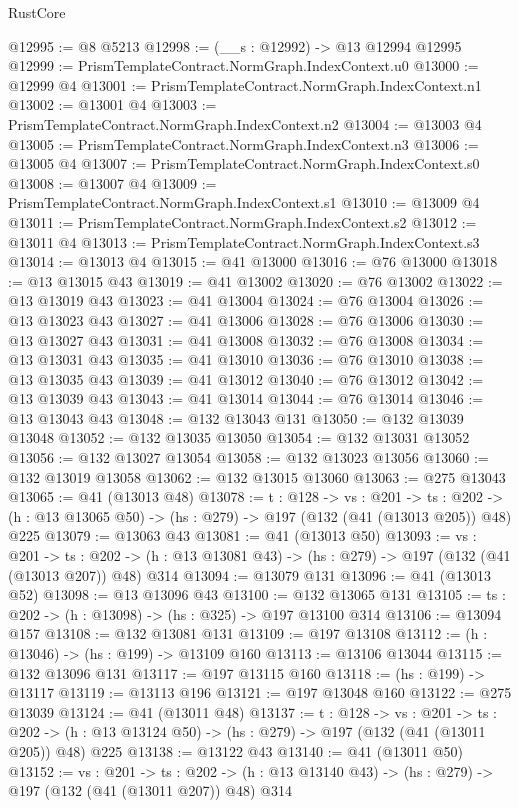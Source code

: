 \begin{lexlean}{RustCore}
\begin{coremodule}
@12995 := @8 @5213
@12998 := (__s : @12992) -> @13 @12994 @12995
@12999 := PrismTemplateContract.NormGraph.IndexContext.u0
@13000 := @12999 @4
@13001 := PrismTemplateContract.NormGraph.IndexContext.n1
@13002 := @13001 @4
@13003 := PrismTemplateContract.NormGraph.IndexContext.n2
@13004 := @13003 @4
@13005 := PrismTemplateContract.NormGraph.IndexContext.n3
@13006 := @13005 @4
@13007 := PrismTemplateContract.NormGraph.IndexContext.s0
@13008 := @13007 @4
@13009 := PrismTemplateContract.NormGraph.IndexContext.s1
@13010 := @13009 @4
@13011 := PrismTemplateContract.NormGraph.IndexContext.s2
@13012 := @13011 @4
@13013 := PrismTemplateContract.NormGraph.IndexContext.s3
@13014 := @13013 @4
@13015 := @41 @13000
@13016 := @76 @13000
@13018 := @13 @13015 @43
@13019 := @41 @13002
@13020 := @76 @13002
@13022 := @13 @13019 @43
@13023 := @41 @13004
@13024 := @76 @13004
@13026 := @13 @13023 @43
@13027 := @41 @13006
@13028 := @76 @13006
@13030 := @13 @13027 @43
@13031 := @41 @13008
@13032 := @76 @13008
@13034 := @13 @13031 @43
@13035 := @41 @13010
@13036 := @76 @13010
@13038 := @13 @13035 @43
@13039 := @41 @13012
@13040 := @76 @13012
@13042 := @13 @13039 @43
@13043 := @41 @13014
@13044 := @76 @13014
@13046 := @13 @13043 @43
@13048 := @132 @13043 @131
@13050 := @132 @13039 @13048
@13052 := @132 @13035 @13050
@13054 := @132 @13031 @13052
@13056 := @132 @13027 @13054
@13058 := @132 @13023 @13056
@13060 := @132 @13019 @13058
@13062 := @132 @13015 @13060
@13063 := @275 @13043
@13065 := @41 (@13013 @48)
@13078 := {t : @128} ->
  {vs : @201} ->
  {ts : @202} -> (h : @13 @13065 @50) -> (hs : @279) -> @197 (@132 (@41 (@13013 @205)) @48) @225
@13079 := @13063 @43
@13081 := @41 (@13013 @50)
@13093 := {vs : @201} ->
  {ts : @202} -> (h : @13 @13081 @43) -> (hs : @279) -> @197 (@132 (@41 (@13013 @207)) @48) @314
@13094 := @13079 @131
@13096 := @41 (@13013 @52)
@13098 := @13 @13096 @43
@13100 := @132 @13065 @131
@13105 := {ts : @202} -> (h : @13098) -> (hs : @325) -> @197 @13100 @314
@13106 := @13094 @157
@13108 := @132 @13081 @131
@13109 := @197 @13108
@13112 := (h : @13046) -> (hs : @199) -> @13109 @160
@13113 := @13106 @13044
@13115 := @132 @13096 @131
@13117 := @197 @13115 @160
@13118 := (hs : @199) -> @13117
@13119 := @13113 @196
@13121 := @197 @13048 @160
@13122 := @275 @13039
@13124 := @41 (@13011 @48)
@13137 := {t : @128} ->
  {vs : @201} ->
  {ts : @202} -> (h : @13 @13124 @50) -> (hs : @279) -> @197 (@132 (@41 (@13011 @205)) @48) @225
@13138 := @13122 @43
@13140 := @41 (@13011 @50)
@13152 := {vs : @201} ->
  {ts : @202} -> (h : @13 @13140 @43) -> (hs : @279) -> @197 (@132 (@41 (@13011 @207)) @48) @314

\end{coremodule}
\end{lexlean}
